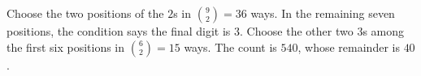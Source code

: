 Choose the two positions of the $2$s in $\binom92=36$ ways. In the remaining seven positions, the condition says the final digit is $3$. Choose the other two $3$s among the first six positions in $\binom62=15$ ways. The count is $540$, whose remainder is $\boxed{40}$.
